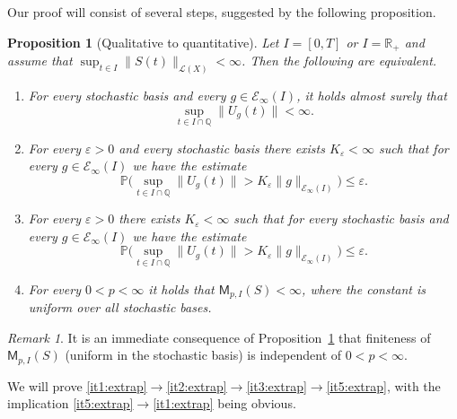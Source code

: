 \documentclass[11pt]{amsart}
\newtheorem{proposition}[theorem]{Proposition}
\theoremstyle{definition}
\theoremstyle{remark}
\newtheorem{remark}[theorem]{Remark}
\numberwithin{equation}{section}
\renewcommand{\P}{\mathbb P}
\newcommand{\Q}{\mathbb Q}
\newcommand{\R}{\mathbb R}
\newcommand{\1}{\mathbf 1}
\newcommand{\cM}{\mathsf{M}}
\newcommand{\norm}[1]{\lVert #1\rVert}
\begin{document}
Our proof will consist of several steps, suggested by the following proposition. 
\begin{proposition}[Qualitative to quantitative]
    \label{prop:extrap}
    Let $I=[0,T]$ or $I = \R_+$ and assume that $\sup_{t \in I}\norm{S(t)}_{\mathscr{L}(X)}<\infty$.
    Then the following are equivalent.
    \begin{enumerate}[label=(\arabic*)]
        \item\label{it1:extrap} For every stochastic basis and every \(g\in\mathcal E_\infty(I)\), it holds almost surely that
        \[
            \sup_{t \in I \cap \Q} \norm{U_g(t)} < \infty.
        \]
        \item\label{it2:extrap} For every $\varepsilon > 0$ and every stochastic basis there exists $K_{\varepsilon} < \infty$ such that for every \(g\in\mathcal E_\infty(I)\) we have the estimate
         \begin{equation*}
          \P\Big(
          \sup_{t \in I \cap \Q} \norm{U_g(t)} >K_\varepsilon
           \norm{g}_{\mathcal E_\infty(I)}
          \Big)\leq\varepsilon.
         \end{equation*}
        \item\label{it3:extrap} For every $\varepsilon > 0$ there exists $K_{\varepsilon} < \infty$ such that for every stochastic basis and every  \(g\in\mathcal E_\infty(I)\) we have the estimate
         \begin{equation*}
          \P\Big(
          \sup_{t \in I \cap \Q} \norm{U_g(t)} >K_\varepsilon
           \norm{g}_{\mathcal E_\infty(I)}
          \Big)\leq\varepsilon.
         \end{equation*}
        \item\label{it5:extrap} For every $0 < p < \infty$  it holds that $\cM_{p,I}(S) < \infty$, where the constant is uniform over all stochastic bases.
    \end{enumerate}
\end{proposition}

\begin{remark}
    It is an immediate consequence of Proposition~\ref{prop:extrap} that finiteness of $\cM_{p,I}(S)$ (uniform in the stochastic basis) is independent of $0 < p < \infty$.
\end{remark}


We will prove \ref{it1:extrap}$\to$\ref{it2:extrap}$\to$\ref{it3:extrap}$\to$\ref{it5:extrap}, with the implication \ref{it5:extrap}$\to$\ref{it1:extrap} being obvious.
\end{document}
